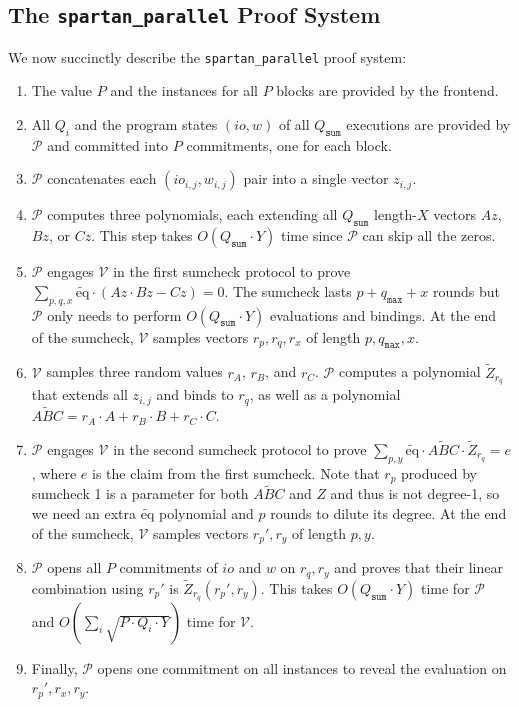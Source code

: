 \documentclass{article}
\newcommand{\code}{\texttt}
\newcommand{\Qsum}{Q_{\mathtt{sum}}}
\newcommand{\qmax}{q_{\mathtt{max}}}
\renewcommand{\P}{\mathcal{P}}
\newcommand{\V}{\mathcal{V}}
\newcommand{\Z}{\widetilde{Z}}
\newcommand{\ABC}{\widetilde{ABC}}
\newcommand{\eq}{\widetilde{\mbox{eq}}}
\begin{document}
\subsection{The \code{spartan\_parallel} Proof System}
We now succinctly describe the \code{spartan\_parallel} proof system:
\begin{enumerate}
    \item The value $P$ and the instances for all $P$ blocks are provided by the frontend.
    \item All $Q_i$ and the program states $(io, w)$ of all $\Qsum$ executions are provided by $\P$ and committed into $P$ commitments, one for each block.
    \item $\P$ concatenates each $(io_{i, j}, w_{i, j})$ pair into a single vector $z_{i, j}$.
    \item $\P$ computes three polynomials, each extending all $\Qsum$ length-$X$ vectors $Az$, $Bz$, or $Cz$. This step takes $O(\Qsum\cdot Y)$ time since $\P$ can skip all the zeros.
    \item $\P$ engages $\V$ in the first sumcheck protocol to prove $\sum_{p, q, x} \eq\cdot (Az \cdot Bz - Cz) = 0$. The sumcheck lasts $p + \qmax + x$ rounds but $\P$ only needs to perform $O(\Qsum\cdot Y)$ evaluations and bindings. At the end of the sumcheck, $\V$ samples vectors $r_p, r_q, r_x$ of length $p, \qmax, x$.
    \item $\V$ samples three random values $r_A$, $r_B$, and $r_C$. $\P$ computes a polynomial $\Z_{r_q}$ that extends all $z_{i, j}$ and binds to $r_q$, as well as a polynomial $\ABC = r_A\cdot A + r_B\cdot B + r_C\cdot C$.
    \item $\P$ engages $\V$ in the second sumcheck protocol to prove $\sum_{p, y} \eq\cdot \ABC \cdot \Z_{r_q} = e$, where $e$ is the claim from the first sumcheck. Note that 
    $r_p$ produced by sumcheck 1 is a parameter for both $\ABC$ and $Z$ and thus is not degree-1, so we need an extra $\eq$ polynomial and $p$ rounds to dilute its degree. At the end of the sumcheck, $\V$ samples vectors $r_p', r_y$ of length $p, y$.
    \item $\P$ opens all $P$ commitments of $io$ and $w$ on $r_q, r_y$ and proves that their linear combination using $r_p'$ is $\Z_{r_q}(r_p', r_y)$. This takes $O(\Qsum\cdot Y)$ time for $\P$ and $O(\sum_i\sqrt{P\cdot Q_i\cdot Y})$ time for $\V$.
    \item Finally, $\P$ opens one commitment on all instances to reveal the evaluation on $r_p', r_x, r_y$.
\end{enumerate}
\end{document}
